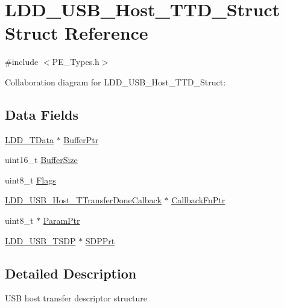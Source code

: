 \hypertarget{struct_l_d_d___u_s_b___host___t_t_d___struct}{}\section{L\+D\+D\+\_\+\+U\+S\+B\+\_\+\+Host\+\_\+\+T\+T\+D\+\_\+\+Struct Struct Reference}
\label{struct_l_d_d___u_s_b___host___t_t_d___struct}


{\ttfamily \#include $<$P\+E\+\_\+\+Types.\+h$>$}



Collaboration diagram for L\+D\+D\+\_\+\+U\+S\+B\+\_\+\+Host\+\_\+\+T\+T\+D\+\_\+\+Struct\+:
\subsection*{Data Fields}
\begin{DoxyCompactItemize}
\item 
\hyperlink{group___p_e___types__module_gade8ef9401405bd941b6da738b807f980}{L\+D\+D\+\_\+\+T\+Data} $\ast$ \hyperlink{struct_l_d_d___u_s_b___host___t_t_d___struct_a974cee8faf8fde9116aa1eb7195152ac}{Buffer\+Ptr}
\item 
uint16\+\_\+t \hyperlink{struct_l_d_d___u_s_b___host___t_t_d___struct_a3b761a3207bcb478edc3986374878210}{Buffer\+Size}
\item 
uint8\+\_\+t \hyperlink{struct_l_d_d___u_s_b___host___t_t_d___struct_aeb3f0fed7dd127f81565f62281a7ae41}{Flags}
\item 
\hyperlink{group___p_e___types__module_gaf3216125fc7eeaf57f2ac2ac4806aaba}{L\+D\+D\+\_\+\+U\+S\+B\+\_\+\+Host\+\_\+\+T\+Transfer\+Done\+Calback} $\ast$ \hyperlink{struct_l_d_d___u_s_b___host___t_t_d___struct_ac48a95a98c254c0af319b714b1a250a5}{Callback\+Fn\+Ptr}
\item 
uint8\+\_\+t $\ast$ \hyperlink{struct_l_d_d___u_s_b___host___t_t_d___struct_a0cbbfa80ed5a4b953a2c15f35bbe6c80}{Param\+Ptr}
\item 
\hyperlink{group___p_e___types__module_ga093e1a023617fe020821061a0c557ad5}{L\+D\+D\+\_\+\+U\+S\+B\+\_\+\+T\+S\+DP} $\ast$ \hyperlink{struct_l_d_d___u_s_b___host___t_t_d___struct_aa33e05b8f9e4dfa8e4f0abb428cb1bcd}{S\+D\+P\+Prt}
\end{DoxyCompactItemize}


\subsection{Detailed Description}
U\+SB host transfer descriptor structure 

